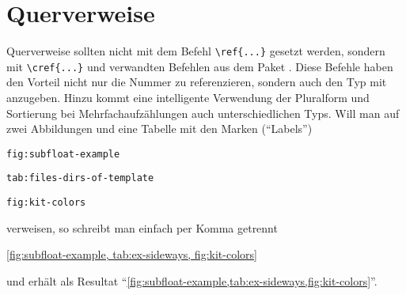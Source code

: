 \section{Querverweise}%
\label{sec:Querverweise}
%
Querverweise sollten nicht mit dem Befehl \verb#\ref{...}# gesetzt werden,
sondern mit \verb#\cref{...}# und verwandten Befehlen aus dem Paket
 \cite{Cubitt2013}.
Diese Befehle haben den Vorteil nicht nur die Nummer zu referenzieren,
sondern auch den Typ mit anzugeben.
Hinzu kommt eine intelligente Verwendung der Pluralform und
Sortierung bei Mehrfachaufzählungen auch unterschiedlichen Typs.
Will man \bspw auf zwei Abbildungen und eine Tabelle mit den Marken (\enquote{Labels})
%
\begin{itemize*}
\item \texttt{fig:subfloat-example}
\item \texttt{tab:files-dirs-of-template}
\item \texttt{fig:kit-colors}
\end{itemize*}
%
verweisen, so schreibt man einfach per Komma getrennt
%
\begin{latex}[caption={Cleveres Referenzieren mit \bs cref},label={lst:cref}]
\cref{fig:subfloat-example,
      tab:ex-sideways,
      fig:kit-colors}
\end{latex}
%
und erhält als Resultat
\enquote{\cref{fig:subfloat-example,tab:ex-sideways,fig:kit-colors}}.